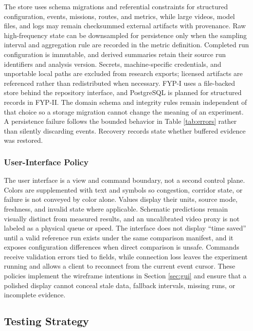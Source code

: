 The store uses schema migrations and referential constraints for structured configuration, events, missions, routes, and metrics, while large videos, model files, and logs may remain checksummed external artifacts with provenance. Raw high-frequency state can be downsampled for persistence only when the sampling interval and aggregation rule are recorded in the metric definition. Completed run configuration is immutable, and derived summaries retain their source run identifiers and analysis version. Secrets, machine-specific credentials, and unportable local paths are excluded from research exports; licensed artifacts are referenced rather than redistributed when necessary. FYP-I uses a file-backed store behind the repository interface, and PostgreSQL is planned for structured records in FYP-II. The domain schema and integrity rules remain independent of that choice so a storage migration cannot change the meaning of an experiment. A persistence failure follows the bounded behavior in Table \ref{tab:errors} rather than silently discarding events. Recovery records state whether buffered evidence was restored.

\subsubsection{User-Interface Policy}

The user interface is a view and command boundary, not a second control plane. Colors are supplemented with text and symbols so congestion, corridor state, or failure is not conveyed by color alone. Values display their units, source mode, freshness, and invalid state where applicable. Schematic predictions remain visually distinct from measured results, and an uncalibrated video proxy is not labeled as a physical queue or speed. The interface does not display ``time saved'' until a valid reference run exists under the same comparison manifest, and it exposes configuration differences when direct comparison is unsafe. Commands receive validation errors tied to fields, while connection loss leaves the experiment running and allows a client to reconnect from the current event cursor. These policies implement the wireframe intentions in Section \ref{sec:gui} and ensure that a polished display cannot conceal stale data, fallback intervals, missing runs, or incomplete evidence.

\subsection{Testing Strategy}

